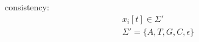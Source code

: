 \documentclass[preview]{standalone}
\begin{document}
\begin{center}
consistency:\\
            \begin{eqnarray*}
            x_i[t] \in \Sigma '\\
            \Sigma ' = \{A,T,G,C,\epsilon \}
            \end{eqnarray*}
\end{center}
\end{document}
